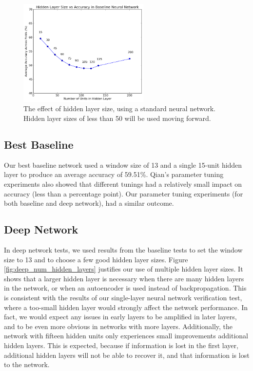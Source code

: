 \documentclass[letterpaper,twocolumn,12pt]{article}
\begin{document}
\begin{figure}[ht!]
\centering
\includegraphics[width=65mm]{results/baseline/baseline_hiddenLayerSize.png}
\caption{The effect of hidden layer size, using a standard neural network.  Hidden layer sizes of less than 50 will be used moving forward.}
\label{fig:baseline_hidden_layer_size}
\end{figure}

\subsection{Best Baseline}
\label{subsec:bestbaseline}
Our best baseline network used a window size of 13 and a single 15-unit hidden layer to produce an average accuracy of 59.51\%.
Qian's parameter tuning experiments also showed that different tunings had a relatively small impact on accuracy (less than a percentage point).
Our parameter tuning experiments (for both baseline and deep network), had a similar outcome.

\subsection{Deep Network}
In deep network tests, we used results from the baseline tests to set the window size to 13 and to choose a few good hidden layer sizes.
Figure \ref{fig:deep_num_hidden_layers} justifies our use of multiple hidden layer sizes.
It shows that a larger hidden layer is necessary when there are many hidden layers in the network, or when an autoencoder is used instead of backpropagation.
This is consistent with the results of our single-layer neural network verification test, where a too-small hidden layer would strongly affect the network performance.
In fact, we would expect any issues in early layers to be amplified in later layers, and to be even more obvious in networks with more layers.
Additionally, the network with fifteen hidden units only experiences small improvements additional hidden layers.
This is expected, because if information is lost in the first layer, additional hidden layers will not be able to recover it, and that information is lost to the network.
\end{document}

